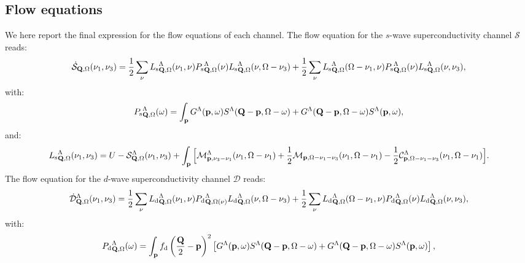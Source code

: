 \subsection{Flow equations}
\label{sec:FlowEquations}

We here report the final expression for the flow equations of each channel.
The flow equation for the $s$-wave superconductivity channel $\mathcal{S}$ reads:
\begin{equation}
\dot{\mathcal{S}}_{\mathbf{Q},\Omega}(\nu_1,\nu_3) = 
  \frac{1}{2} \sum_{\nu}{L_\mathrm{s}}^{\Lambda}_{\mathbf{Q},\Omega} (\nu_1,\nu) {P_{\mathrm{s}}}^{\Lambda}_{\mathbf{Q},\Omega}(\nu) {L_\mathrm{s}}^{\Lambda}_{\mathbf{Q},\Omega} (\nu,\Omega-\nu_3)
+ \frac{1}{2} \sum_{\nu}{L_\mathrm{s}}^{\Lambda}_{\mathbf{Q},\Omega} (\Omega-\nu_1,\nu) {P_{\mathrm{s}}}^{\Lambda}_{\mathbf{Q},\Omega}(\nu) {L_\mathrm{s}}^{\Lambda}_{\mathbf{Q},\Omega}(\nu,\nu_3),
\end{equation} 	   
with: 
\begin{equation}
{P_{\mathrm{s}}}^{\Lambda}_{\mathbf{Q},\Omega}(\omega) = \int_{\mathbf{p}}  G^{\Lambda}(\mathbf{p},\omega)S^{\Lambda}(\mathbf{Q}-\mathbf{p},\Omega-\omega) + 
G^{\Lambda}(\mathbf{Q}-\mathbf{p},\Omega-\omega) S^{\Lambda}(\mathbf{p},\omega), 
\label{eq:app:P_pp}
\end{equation} 
and: 
\begin{align} 
\label{eq:Lswave}
{L_\mathrm{s}}^{\Lambda}_{\mathbf{Q},\Omega}(\nu_1,\nu_3) = U-\mathcal{S}^{\Lambda}_{\mathbf{Q},\Omega} (\nu_1,\nu_3)
+ \int_{\mathbf{p}}  \Big[ \mathcal{M}^{\Lambda}_{\mathbf{p},\nu_3-\nu_1}(\nu_1,\Omega-\nu_1) + \frac{1}{2} \mathcal{M}_{\mathbf{p},\Omega-\nu_1-\nu_3}(\nu_1,\Omega-\nu_1) 
- \frac{1}{2} \mathcal{C}^{\Lambda}_{\mathbf{p},\Omega-\nu_1-\nu_3}(\nu_1,\Omega-\nu_1) \Big]. 
\end{align}	 
The flow equation for the $d$-wave superconductivity channel  $\mathcal{D}$ reads:
\begin{equation}
\dot{\mathcal{D}}^{\Lambda}_{\mathbf{Q},\Omega}(\nu_1,\nu_3) = 
  \frac{1}{2} \sum_{\nu}{L_\mathrm{d}}^{\Lambda}_{\mathbf{Q},\Omega}(\nu_1,\nu) {P_{\mathrm{d}}}^{\Lambda}_{\mathbf{Q},\Omega(\nu)} {L_\mathrm{d}}^{\Lambda}_{\mathbf{Q},\Omega} (\nu,\Omega-\nu_3) 
+ \frac{1}{2} \sum_{\nu}{L_\mathrm{d}}^{\Lambda}_{\mathbf{Q},\Omega}(\Omega-\nu_1,\nu) {P_{\mathrm{d}}}^{\Lambda}_{\mathbf{Q},\Omega}(\nu) {L_\mathrm{d}}^{\Lambda}_{\mathbf{Q},\Omega}(\nu,\nu_3),
\label{eq:dwaveflow}
\end{equation}
with: 
\begin{equation}
{P_{\mathrm{d}}}^{\Lambda}_{\mathbf{Q},\Omega}(\omega) = \int_{\mathbf{p}}  f_{\mathrm{d}}\left(\frac{\mathbf{Q}}{2}-\mathbf{p}\right)^2 
\left[ G^{\Lambda}(\mathbf{p},\omega)S^{\Lambda}(\mathbf{Q}-\mathbf{p},\Omega-\omega) +G^{\Lambda}(\mathbf{Q}-\mathbf{p},\Omega-\omega)
S^{\Lambda}(\mathbf{p},\omega) \right], 
\label{eq:app:P_pp}
\end{equation} 
